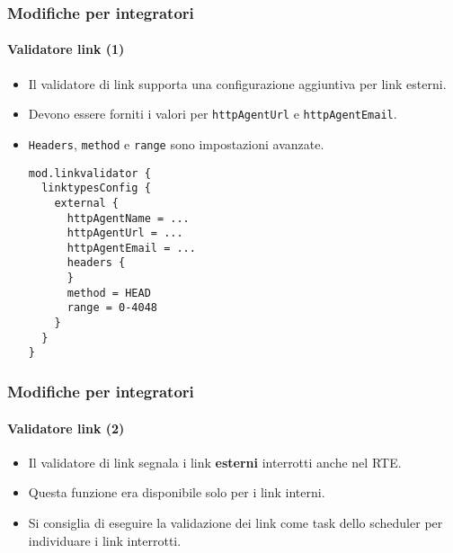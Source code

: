 
\begin{frame}[fragile]
	\frametitle{Modifiche per integratori}
	\framesubtitle{Validatore link (1)}

	\lstset{basicstyle=\tiny\ttfamily}

	\begin{itemize}
		\item Il validatore di link supporta una configurazione aggiuntiva per link esterni.
		\item Devono essere forniti i valori per \texttt{httpAgentUrl} e \texttt{httpAgentEmail}.
		\item \texttt{Headers}, \texttt{method} e \texttt{range} sono impostazioni avanzate.
\begin{lstlisting}
mod.linkvalidator {
  linktypesConfig {
    external {
      httpAgentName = ...
      httpAgentUrl = ...
      httpAgentEmail = ...
      headers {
      }
      method = HEAD
      range = 0-4048
    }
  }
}
\end{lstlisting}

	\end{itemize}

\end{frame}


\begin{frame}[fragile]
	\frametitle{Modifiche per integratori}
	\framesubtitle{Validatore link (2)}

	\begin{itemize}
		\item Il validatore di link segnala i link \textbf{esterni} interrotti anche nel RTE.
		\item Questa funzione era disponibile solo per i link interni.
		\item Si consiglia di eseguire la validazione dei link come task dello scheduler per individuare i link interrotti.
	\end{itemize}

\end{frame}

